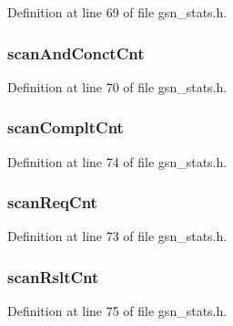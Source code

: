 Definition at line 69 of file gsn\_\-stats.h.

\hypertarget{a00301_a31ec231419f5b7f737ab1b40a51e76e0}{
\subsubsection[{scanAndConctCnt}]{ {\bf scanAndConctCnt}}}
\label{a00301_a31ec231419f5b7f737ab1b40a51e76e0}


Definition at line 70 of file gsn\_\-stats.h.

\hypertarget{a00301_a3ce276030f25433e1cc4f5458c7c1879}{
\subsubsection[{scanCompltCnt}]{ {\bf scanCompltCnt}}}
\label{a00301_a3ce276030f25433e1cc4f5458c7c1879}


Definition at line 74 of file gsn\_\-stats.h.

\hypertarget{a00301_a8c34d8207b71d4cc5880cd1a3bdb8d1e}{
\subsubsection[{scanReqCnt}]{ {\bf scanReqCnt}}}
\label{a00301_a8c34d8207b71d4cc5880cd1a3bdb8d1e}


Definition at line 73 of file gsn\_\-stats.h.

\hypertarget{a00301_a81e1efdce4f7abc685aeced74cdf5999}{
\subsubsection[{scanRsltCnt}]{ {\bf scanRsltCnt}}}
\label{a00301_a81e1efdce4f7abc685aeced74cdf5999}


Definition at line 75 of file gsn\_\-stats.h.

